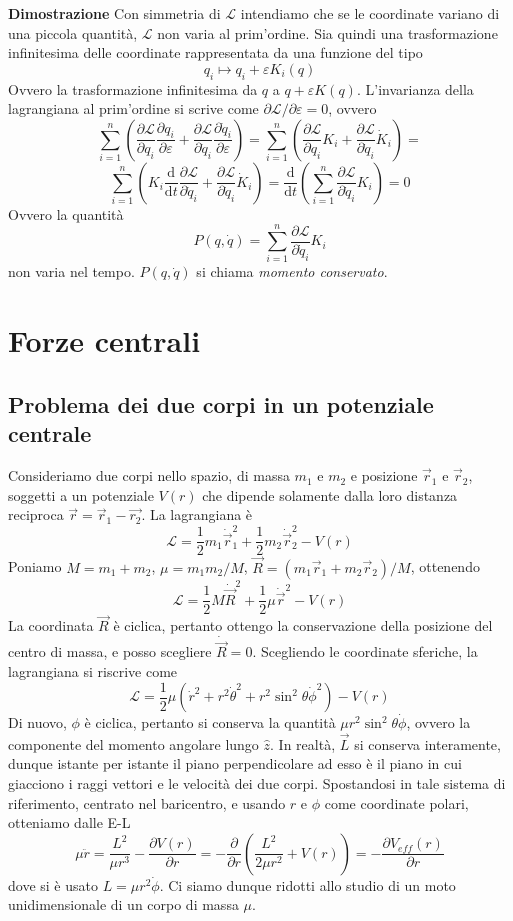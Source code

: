\documentclass[a4paper,11pt]{article}
\begin{document}
\noindent\textbf{Dimostrazione} Con simmetria di $\mathcal{L}$ intendiamo che se le coordinate variano di una piccola quantità, $\mathcal{L}$ non varia al prim'ordine.
Sia quindi una trasformazione infinitesima delle coordinate rappresentata da una funzione del tipo
$$q_i\mapsto q_i+\varepsilon K_i(q)$$
Ovvero la trasformazione infinitesima da $q$ a $q+\varepsilon K(q)$. L'invarianza della lagrangiana al prim'ordine si scrive come $\partial\mathcal{L}/\partial\varepsilon=0$, ovvero
$$\sum_{i=1}^{n}\left(\frac{\partial\mathcal{L}}{\partial q_i}\frac{\partial q_i}{\partial\varepsilon}+\frac{\partial\mathcal{L}}{\partial \dot{q}_i}\frac{\partial \dot{q}_i}{\partial\varepsilon}\right)=\sum_{i=1}^{n}\left(\frac{\partial\mathcal{L}}{\partial q_i}K_i+\frac{\partial\mathcal{L}}{\partial \dot{q}_i}\dot{K}_i\right)=$$
$$\sum_{i=1}^{n}\left(K_i\frac{\mathrm{d}}{\mathrm{d}t}\frac{\partial\mathcal{L}}{\partial \dot{q}_i}+\frac{\partial\mathcal{L}}{\partial \dot{q}_i}\dot{K}_i\right)=\frac{\mathrm{d}}{\mathrm{d}t}\left(\sum_{i=1}^{n}\frac{\partial\mathcal{L}}{\partial\dot{q}_i}K_i\right)=0$$
Ovvero la quantità
$$P(q,\dot{q})=\sum_{i=1}^{n}\frac{\partial\mathcal{L}}{\partial\dot{q}_i}K_i$$
non varia nel tempo. $P(q, \dot{q})$ si chiama \textit{momento conservato}.

\newpage
\section{Forze centrali}
\subsection{Problema dei due corpi in un potenziale centrale}
\noindent Consideriamo due corpi nello spazio, di massa $m_1$ e $m_2$ e posizione $\vec{r}_1$ e $\vec{r}_2$, soggetti a un potenziale $V(r)$ che dipende solamente dalla loro distanza reciproca $\vec{r}=\vec{r}_1-\vec{r_2}$. La lagrangiana è
$$\mathcal{L}=\frac{1}{2}m_1\dot{\vec{r}}_1^2+\frac{1}{2}m_2\dot{\vec{r}}_2^2-V(r)$$
Poniamo  $M=m_1+m_2$, $\mu=m_1m_2/M$, $\vec{R}=(m_1\vec{r}_1+m_2\vec{r}_2)/M$, ottenendo
$$\mathcal{L}=\frac{1}{2}M\dot{\vec{R}}^2+\frac{1}{2}\mu\dot{\vec{r}}^2-V(r)$$
La coordinata $\vec{R}$ è ciclica, pertanto ottengo la conservazione della posizione del centro di massa, e posso scegliere $\dot{\vec{R}}=0$. Scegliendo le coordinate sferiche, la lagrangiana si riscrive come
$$\mathcal{L}=\frac{1}{2}\mu(\dot{r}^2+r^2\dot{\theta}^2+r^2\sin^2\theta\dot{\phi}^2)-V(r)$$
Di nuovo, $\phi$ è ciclica, pertanto si conserva la quantità $\mu r^2\sin^2\theta\dot{\phi}$, ovvero la componente del momento angolare lungo $\hat{z}$. In realtà, $\vec{L}$ si conserva interamente, dunque istante per istante il piano perpendicolare ad esso è il piano in cui giacciono i raggi vettori e le velocità dei due corpi. Spostandosi in tale sistema di riferimento, centrato nel baricentro, e usando $r$ e $\phi$ come coordinate polari, otteniamo dalle E-L
$$\mu\ddot{r}=\frac{L^2}{\mu r^3}-\frac{\partial V(r)}{\partial r}=-\frac{\partial}{\partial r}\left(\frac{L^2}{2\mu r^2}+V(r)\right)=-\frac{\partial V_{eff}(r)}{\partial r}$$
dove si è usato $L=\mu r^2\dot{\phi}$. Ci siamo dunque ridotti allo studio di un moto unidimensionale di un corpo di massa $\mu$. 
\end{document}
